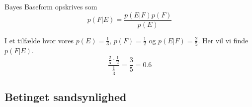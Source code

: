 Bayes Baseform opskrives som 
\begin{equation}
	p(F|E)=\frac{p(E|F)p(F)}{p(E)}
\end{equation}

I et tilfælde hvor vores $p(E)= \frac{1}{3}$, $p(F)=\frac{1}{2}$ og $p(E|F)=\frac{2}{5}$. Her vil vi finde $p(F|E)$.
\begin{equation}
	\frac{\frac{2}{5}\cdot\frac{1}{2}}{\frac{1}{3}}=\frac{3}{5}=0.6
\end{equation}


\subsection{Betinget sandsynlighed}
